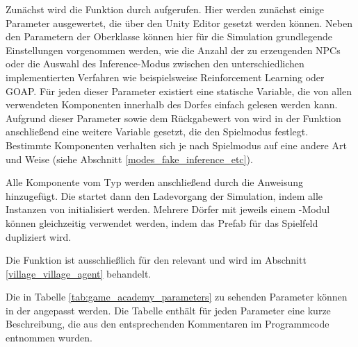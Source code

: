 Zunächst wird die Funktion  durch  aufgerufen. Hier werden zunächst einige Parameter ausgewertet, die über den Unity Editor gesetzt werden können. Neben den Parametern der Oberklasse  können hier für die Simulation grundlegende Einstellungen vorgenommen werden, wie die Anzahl der zu erzeugenden NPCs oder die Auswahl des Inference-Modus zwischen den unterschiedlichen implementierten Verfahren wie beispielsweise Reinforcement Learning oder GOAP. Für jeden dieser Parameter existiert eine statische Variable, die von allen verwendeten Komponenten innerhalb des Dorfes einfach gelesen werden kann.
Aufgrund dieser Parameter sowie dem Rückgabewert von  wird in der Funktion  anschließend eine weitere Variable gesetzt, die den Spielmodus festlegt. Bestimmte Komponenten verhalten sich je nach Spielmodus auf eine andere Art und Weise (siehe Abschnitt \ref{modes_fake_inference_etc}).

Alle Komponente vom Typ  werden anschließend durch die Anweisung  hinzugefügt. Die  startet dann den Ladevorgang der Simulation, indem alle Instanzen von  initialisiert werden. Mehrere Dörfer mit jeweils einem -Modul können gleichzeitig verwendet werden, indem das Prefab für das Spielfeld dupliziert wird.

Die Funktion  ist ausschließlich für den  relevant und wird im Abschnitt \ref{village_village_agent} behandelt.

Die in Tabelle \ref{tab:game_academy_parameters} zu sehenden Parameter können in der  angepasst werden. Die Tabelle enthält für jeden Parameter eine kurze Beschreibung, die aus den entsprechenden Kommentaren im Programmcode entnommen wurden.

